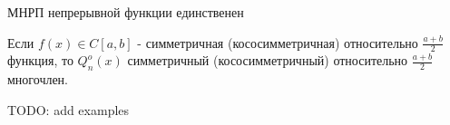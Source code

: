 \begin{ticket}
  \begin{example}
    
  \end{example}
  \begin{theorem}
    МНРП непрерывной функции единственен
  \end{theorem}
  \begin{corollary}
    Если $f(x)\in C[a,b]$ - симметричная (кососимметричная) относительно $\frac{a+b}{2}$ функция, то
    $Q_n^o(x)$ симметричный (кососимметричный) относительно $\frac{a+b}{2}$ многочлен.
  \end{corollary}  

  TODO: add examples

  
\end{ticket}
